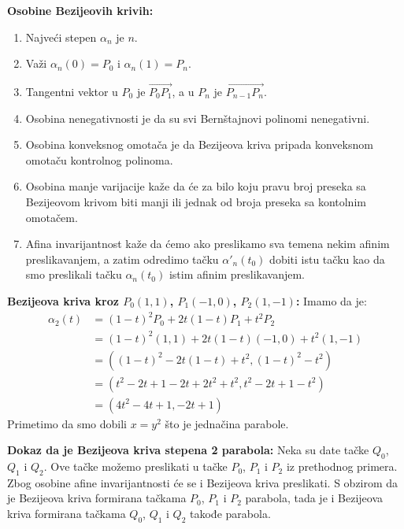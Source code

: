 \documentclass[12pt]{article}
\newcommand{\vek}[1]{\overrightarrow{#1}}
\begin{document}
\textbf{Osobine Bezijeovih krivih:}
\begin{enumerate}[label=\textbf{(\arabic*)}]
    \item Najveći stepen $\alpha_n$ je $n$.
    \item Važi $\alpha_n(0)=P_0$ i $\alpha_n(1)=P_n$.
    \item Tangentni vektor u $P_0$ je $\vek{P_0P_1}$, a u $P_n$ je
          $\vek{P_{n-1}P_n}$.
    \item Osobina nenegativnosti je da su svi Bernštajnovi polinomi
          nenegativni.
    \item Osobina konveksnog omotača je da Bezijeova kriva pripada konveksnom
          omotaču kontrolnog polinoma.
    \item Osobina manje varijacije kaže da će za bilo koju pravu broj preseka
          sa Bezijeovom
          krivom biti manji ili jednak od broja preseka sa kontolnim omotačem.
    \item Afina invarijantnost kaže da ćemo ako preslikamo sva temena nekim
          afinim preslikavanjem, a zatim odredimo tačku $\alpha'_n(t_0)$ dobiti
          istu tačku kao da smo preslikali tačku $\alpha_n(t_0)$ istim afinim
          preslikavanjem.
\end{enumerate}
\par

\textbf{Bezijeova kriva kroz $P_0(1, 1)$, $P_1(-1, 0)$, $P_2(1, -1)$:} Imamo da
je: \begin{align*}
    \alpha_2(t) & =(1-t)^2P_0+2t(1-t)P_1+t^2P_2         \\
                & =(1-t)^2(1,1)+2t(1-t)(-1,0)+t^2(1,-1) \\
                & =((1-t)^2-2t(1-t)+t^2,(1-t)^2-t^2)    \\
                & =(t^2-2t+1-2t+2t^2+t^2,t^2-2t+1-t^2)  \\
                & =(4t^2-4t+1,-2t+1)
\end{align*}
Primetimo da smo dobili $x=y^2$ što je jednačina parabole.
\par

\textbf{Dokaz da je Bezijeova kriva stepena 2 parabola:} Neka su date tačke
$Q_0$, $Q_1$ i $Q_2$. Ove tačke možemo preslikati u tačke $P_0$, $P_1$ i $P_2$
iz prethodnog primera. Zbog osobine afine invarijantnosti će se i Bezijeova
kriva preslikati. S obzirom da je Bezijeova kriva formirana tačkama $P_0$,
$P_1$ i $P_2$ parabola, tada je i Bezijeova kriva formirana tačkama $Q_0$,
$Q_1$ i $Q_2$ takođe parabola.
\par
\end{document}
